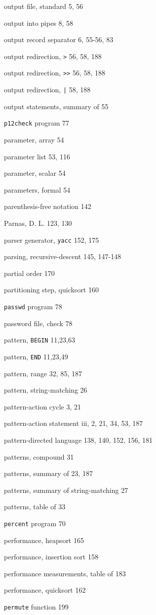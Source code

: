 \begin{multicols}{2}
output file, standard 5, 56

output into pipes 8, 58

output record separator 6, 55-56,  83

output redirection, \verb'>' 56, 58, 188

output redirection, \verb'>>' 56, 58, 188

output redirection, \verb'|' 58, 188

output statements, summary of 55

\verb'p12check' program 77

parameter, array 54

parameter list 53, 116

parameter, scalar 54

parameters, formal 54

parenthesis-free notation 142

Parnas, D. L. 123, 130

parser generator, \verb'yacc' 152, 175

parsing, recursive-descent 145, 147-148

partial order 170

partitioning step, quicksort 160

\verb'passwd' program 78

password file, check 78

pattern, \verb'BEGIN' 11,23,63

pattern, \verb'END' 11,23,49

pattern, range 32, 85, 187

pattern, string-matching 26

pattern-action cycle 3, 21

pattern-action statement iii, 2, 21, 34, 53, 187

pattern-directed language 138,  140, 152, 156, 181

patterns, compound 31

patterns, summary of 23, 187

patterns, summary of string-matching 27

patterns, table of 33

\verb'percent' program 70

performance, heapsort 165

performance, insertion sort 158

performance measurements, table of 183

performance, quicksort 162

\verb'permute' function 199


\end{multicols}
